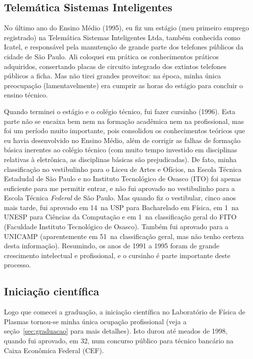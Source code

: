 \subsection{Telemática Sistemas Inteligentes}

No último ano do Ensino Médio (1995), eu fiz um estágio (meu primeiro emprego registrado) na Telemática Sistemas Inteligentes Ltda, também conhecida como Icatel, e responsável pela manutenção de grande parte dos telefones públicos da cidade de São Paulo. Ali coloquei em prática os conhecimentos práticos adquiridos, consertando placas de circuito integrado dos extintos telefones públicos a ficha. Mas não tirei grandes proveitos: na época, minha única preocupação (lamentavelmente) era cumprir as horas do estágio para concluir o ensino técnico.

Quando terminei o estágio e o colégio técnico, fui fazer cursinho (1996). Esta parte não se encaixa bem nem na formação acadêmica nem na profissional, mas foi um período muito importante, pois consolidou os conhecimentos teóricos que eu havia desenvolvido no Ensino Médio, além de corrigir as falhas de formação básica inerentes ao colégio técnico (com muito tempo investido em disciplinas relativas à eletrônica, as disciplinas básicas são prejudicadas). De fato, minha classificação no vestibulinho para o Liceu de Artes e Ofícios, na Escola Técnica Estadudal de São Paulo e no Instituto Tecnológico de Osasco (ITO) foi apenas suficiente para me permitir entrar, e não fui aprovado no vestibulinho para a Escola Técnica \emph{Federal} de São Paulo. Mas quando fiz o vestibular, cinco anos mais tarde, fui aprovado em 14\textordmasculine\ na USP para Bacharelado em Física, em 1\textordmasculine\ na UNESP para Ciências da Computação e em 1\textordmasculine\ na classificação geral do FITO (Faculdade Instituto Tecnológico de Osasco). Também fui aprovado  para a UNICAMP (aparentemente em 51\textordmasculine\ na classificação geral, mas não tenho certeza desta informação). Resumindo, os anos de 1991 a 1995 foram de grande crescimento intelectual e profissional, e o cursinho é parte importante deste processo.

\subsection{Iniciação científica}

Logo que comecei a graduação, a iniciação científica no Laboratório de Física de Plasmas tornou-se minha única ocupação profissional (veja a seção~\ref{sec:graduacao} para mais detalhes). Isto durou até meados de 1998, quando fui aprovado, em 32\textordmasculine, num concurso público para técnico bancário na Caixa Econômica Federal (CEF).

